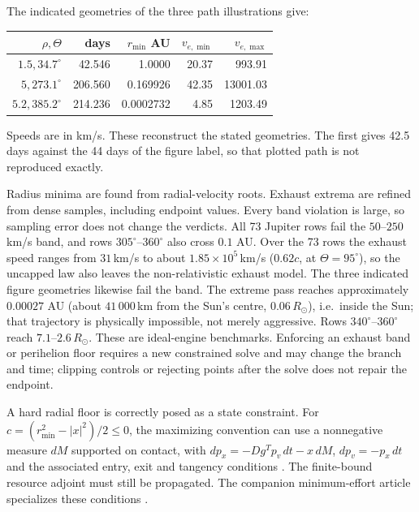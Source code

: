\documentclass[journal,a4paper]{IEEEtran}
\begin{document}
The indicated geometries of the three path illustrations give:
\begin{center}\small
\begin{tabular}{rrrrr}\toprule
$\rho,\Theta$ & days & $r_{\min}$ AU & $v_{e,\min}$ & $v_{e,\max}$\\\midrule
$1.5,34.7^\circ$ &42.546&1.0000&20.37&993.91\\
$5,273.1^\circ$ &206.560&0.169926&42.35&13001.03\\
$5.2,385.2^\circ$ &214.236&0.0002732&4.85&1203.49\\\bottomrule
\end{tabular}
\end{center}
Speeds are in km/s. These reconstruct the stated geometries. The first
gives 42.5 days against the 44 days of the figure label, so that plotted
path is not reproduced exactly.

Radius minima are found from radial-velocity roots. Exhaust extrema are
refined from dense samples, including endpoint values. Every band
violation is large, so sampling error does not change the verdicts. All 73 Jupiter rows fail the $50$--$250$
km/s band, and rows $305^\circ$--$360^\circ$ also cross $0.1$ AU.
Over the 73 rows the exhaust speed ranges from $31$\,km/s to about
$1.85\times10^{5}$\,km/s ($0.62c$, at $\Theta=95^\circ$), so the uncapped
law also leaves the non-relativistic exhaust model.
The three indicated figure geometries likewise fail the band. The extreme
pass reaches approximately $0.00027$ AU (about $41\,000$\,km from the
Sun's centre, $0.06\,R_\odot$), i.e.\ inside the Sun; that trajectory is
physically impossible, not merely aggressive. Rows $340^\circ$--$360^\circ$
reach $7.1$--$2.6\,R_\odot$. These are ideal-engine benchmarks. Enforcing an exhaust
band or perihelion floor requires a new constrained solve and may change
the branch and time; clipping controls or rejecting points after the solve
does not repair the endpoint.

A hard radial floor is correctly posed as a state constraint. For
$c=(r_{\min}^2-|x|^2)/2\le0$, the maximizing convention can use a
nonnegative measure $dM$ supported on contact, with
$dp_x=-Dg^Tp_v\,dt-x\,dM$, $dp_v=-p_x\,dt$ and the associated
entry, exit and tangency conditions \cite{HartlSethiVickson1995}.
The finite-bound resource adjoint must still be propagated. The companion
minimum-effort article specializes these conditions \cite{OlsinaMinimumEffort}.
\end{document}
